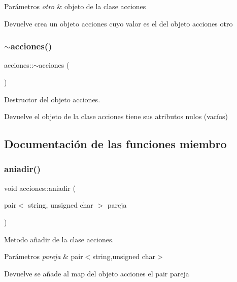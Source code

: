 \begin{DoxyParams}{Parámetros}
{\em otro} & objeto de la clase acciones \\
\hline
\end{DoxyParams}
\begin{DoxyReturn}{Devuelve}
crea un objeto acciones cuyo valor es el del objeto acciones otro 
\end{DoxyReturn}
\mbox{\label{classacciones_a0b92ef93429a415fa57aad7097a135ef}} 
\subsubsection{\texorpdfstring{$\sim$acciones()}{~acciones()}}
{\footnotesize\ttfamily acciones\+::$\sim$acciones (\begin{DoxyParamCaption}{ }\end{DoxyParamCaption})}



Destructor del objeto acciones. 

\begin{DoxyReturn}{Devuelve}
el objeto de la clase acciones tiene sus atributos nulos (vacíos) 
\end{DoxyReturn}


\subsection{Documentación de las funciones miembro}
\mbox{\label{classacciones_ae661f2bc251f1b89103cac9f9b79073e}} 
\subsubsection{\texorpdfstring{aniadir()}{aniadir()}}
{\footnotesize\ttfamily void acciones\+::aniadir (\begin{DoxyParamCaption}\item[{pair$<$ string, unsigned char $>$}]{pareja }\end{DoxyParamCaption})}



Metodo añadir de la clase acciones. 


\begin{DoxyParams}{Parámetros}
{\em pareja} & pair$<$string,unsigned char$>$ \\
\hline
\end{DoxyParams}
\begin{DoxyReturn}{Devuelve}
se añade al map del objeto acciones el pair pareja 
\end{DoxyReturn}
\mbox{\label{classacciones_a465554da68fa2ce846719fa0f5ec0ea4}} 

